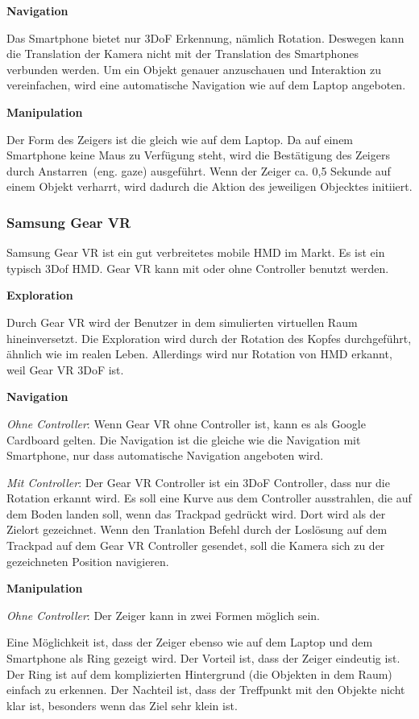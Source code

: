   \textbf{Navigation}
  
  Das Smartphone bietet nur 3DoF Erkennung, nämlich Rotation. Deswegen kann die Translation der Kamera nicht mit der Translation des Smartphones verbunden werden. Um ein Objekt genauer anzuschauen und Interaktion zu vereinfachen, wird eine automatische Navigation wie auf dem Laptop angeboten.
  
  \textbf{Manipulation}
  
  Der Form des Zeigers ist die gleich wie auf dem Laptop. Da auf einem Smartphone keine Maus zu Verfügung steht, wird die Bestätigung des Zeigers durch \glqq Anstarren\grqq\ (eng. gaze) ausgeführt. Wenn der Zeiger ca. 0,5 Sekunde auf einem Objekt verharrt, wird dadurch die Aktion des jeweiligen Objecktes initiiert.
  
 \subsubsection{Samsung Gear VR}
 Samsung Gear VR ist ein gut verbreitetes mobile HMD im Markt. Es ist ein typisch 3Dof HMD. Gear VR kann mit oder ohne Controller benutzt werden.
 
  \textbf{Exploration}
  
  Durch Gear VR wird der Benutzer in dem simulierten virtuellen Raum hineinversetzt. Die Exploration wird durch der Rotation des Kopfes durchgeführt, ähnlich wie im realen Leben. Allerdings wird nur Rotation von HMD erkannt, weil Gear VR 3DoF ist.
  
  \textbf{Navigation}
  
  \textsl{Ohne Controller}: Wenn Gear VR ohne Controller ist, kann es als Google Cardboard gelten. Die Navigation ist die gleiche wie die Navigation mit Smartphone, nur dass automatische Navigation angeboten wird.
 
  \textsl{Mit Controller}: Der Gear VR Controller ist ein 3DoF Controller, dass nur die Rotation erkannt wird. Es soll eine Kurve aus dem Controller ausstrahlen, die auf dem Boden landen soll, wenn das Trackpad gedrückt wird. Dort wird als der Zielort gezeichnet. Wenn den Tranlation Befehl durch der Loslösung auf dem Trackpad auf dem Gear VR Controller gesendet, soll die Kamera sich zu der gezeichneten Position navigieren.

  \textbf{Manipulation}
  
  \textsl{Ohne Controller}: Der Zeiger kann in zwei Formen möglich sein.
  
  Eine Möglichkeit ist, dass der Zeiger ebenso wie auf dem Laptop und dem Smartphone als Ring gezeigt wird. Der Vorteil ist, dass der Zeiger eindeutig ist. Der Ring ist auf dem komplizierten Hintergrund (die Objekten in dem Raum) einfach zu erkennen. Der Nachteil ist, dass der Treffpunkt mit den Objekte nicht klar ist, besonders wenn das Ziel sehr klein ist.
  
